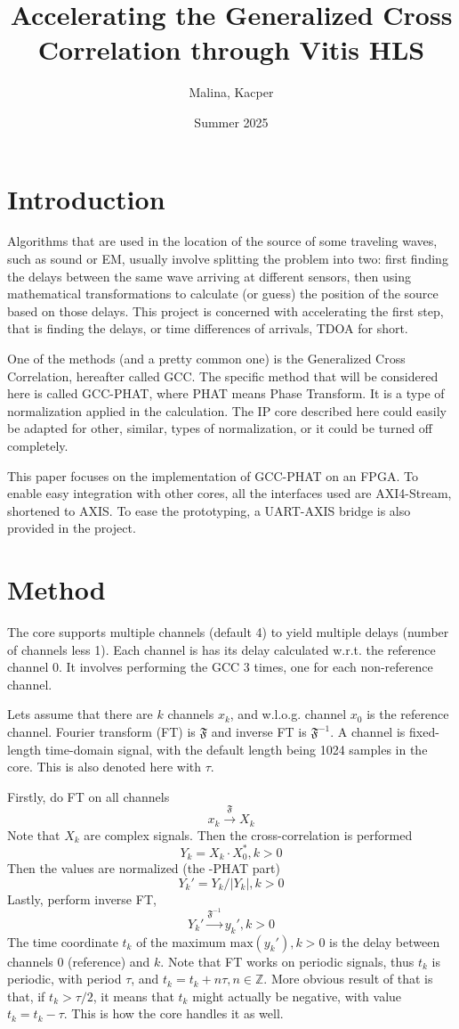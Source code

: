 \documentclass[a4paper,twocolumn]{article}
\title{Accelerating the Generalized Cross Correlation through Vitis HLS}
\date{Summer 2025}
\author{
  Malina, Kacper
}
\begin{document}
\maketitle

\section{Introduction}

Algorithms that are used in the location of the source of
some traveling waves, such as sound or EM, usually involve splitting
the problem into two: first finding the delays between the same wave
arriving at different sensors, then using mathematical transformations
to calculate (or guess) the position of the source based on those
delays\cite{tdoamlat}. This project is concerned with accelerating the
first step, that is finding the delays, or time differences of
arrivals, TDOA for short.

One of the methods (and a pretty common one) is the Generalized Cross
Correlation, hereafter called GCC\cite{gccphat}. The specific method
that will be considered here is called GCC-PHAT, where PHAT means
Phase Transform. It is a type of normalization applied in the
calculation. The IP core described here could easily be adapted for
other, similar, types of normalization, or it could be turned off
completely.

This paper focuses on the implementation of GCC-PHAT on an FPGA. To
enable easy integration with other cores, all the interfaces used are
AXI4-Stream\cite{axis}, shortened to AXIS. To ease the prototyping, a
UART-AXIS bridge is also provided in the project.

\section{Method}

The core supports multiple channels (default 4) to yield multiple
delays (number of channels less 1). Each channel is has its delay
calculated w.r.t. the reference channel 0. It involves performing the
GCC 3 times, one for each non-reference channel.

Lets assume that there are $k$ channels $x_k$, and w.l.o.g. channel
$x_0$ is the reference channel. Fourier transform (FT) is
$\mathfrak F$ and inverse FT is $\mathfrak F^{-1}$. A channel is
fixed-length time-domain signal, with the default length being
1024 samples in the core. This is also denoted here with $\tau$.

Firstly, do FT on all channels
\[x_k \xrightarrow{\mathfrak F} X_k\]
Note that $X_k$ are complex signals.
Then the cross-correlation is performed
\[Y_k = X_k \cdot X_0^*, k > 0\]
Then the values are normalized (the -PHAT part)
\[Y_k' = Y_k / |Y_k|, k > 0\]
Lastly, perform inverse FT,
\[Y_k' \xrightarrow{\mathfrak F^{-1}} y_k', k > 0\]
The time coordinate $t_k$ of the maximum $\mathrm{max}(y_k'), k > 0$
is the delay between channels 0 (reference) and $k$.
Note that FT works on periodic signals, thus $t_k$ is periodic, with
period $\tau$, and $t_k = t_k + n\tau, n\in\mathbb{Z}$. More obvious
result of that is that, if $t_k > \tau / 2$, it means that $t_k$ might
actually be negative, with value $t_k = t_k - \tau$. This is how the
core handles it as well.
\end{document}
